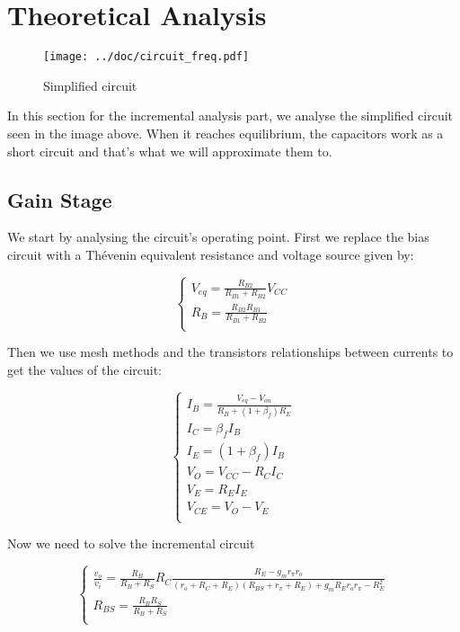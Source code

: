 \section{Theoretical Analysis}
\label{sec:analysis}

\begin{figure}[H] \centering
\texttt{[image: ../doc/circuit\_freq.pdf]}
\caption{Simplified circuit}
\label{fig:simp_cir}
\end{figure}

In this section for the incremental analysis part, we analyse the simplified circuit seen in the image above. When it reaches equilibrium, the capacitors work as a short circuit and that's what we will approximate them to.

\subsection{Gain Stage}
We start by analysing the circuit's operating point.
First we replace the bias circuit with a Thévenin equivalent resistance and voltage source given by:

\begin{equation}\label{eq:v_eq}
\begin{cases}
V_{eq}=\frac{R_{B2}}{R_{B1}+R_{B2}} V_{CC} \\
R_B=\frac{R_{B2}R_{B1}}{R_{B1}+R_{B2}}\\
\end{cases}
\end{equation}

Then we use mesh methods and the transistors relationships between currents to get the values of the circuit:

\begin{equation}\label{eq:Op1}
\begin{cases}
I_B=\frac{V_{eq}-V_{on}}{R_B+(1+\beta_f)R_{E}}\\
I_C=\beta_f I_B\\
I_E=(1+\beta_f)I_B\\
V_O=V_{CC}-R_C I_C\\
V_E=R_E I_E\\
V_{CE}=V_O-V_E\\
\end{cases}
\end{equation}

Now we need to solve the incremental circuit

\begin{equation}\label{eq:v1}
\begin{cases}
\frac{v_o}{v_i}=\frac{R_B}{R_B+R_S} R_C \frac{R_E-g_m r_\pi r_o}{(r_o+R_C+R_E)(R_{BS}+r_\pi+R_E)+g_m R_E r_o r_\pi - R_E^2}\\
R_{BS}=\frac{R_B R_S}{R_B+R_S}\\
\end{cases}
\end{equation}

